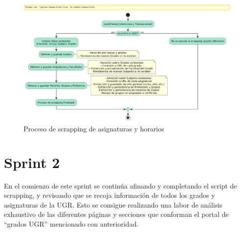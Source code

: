 \begin{figure}[H]
    \centering
    \includegraphics[width=1\textwidth, trim=0 0 0 45, clip]{figures/07_scrapping.png}
    \caption{Proceso de scrapping de asignaturas y horarios}
    \label{fig:scrapping-process}
\end{figure}

\section{Sprint 2}

En el comienzo de este sprint se continúa afinando y completando el script de scrapping, y revisando que se recoja información de todos los grados y asignaturas de la UGR. Esto se consigue realizando una labor de análisis exhaustivo de las diferentes páginas y secciones que conforman el portal de ``grados UGR'' mencionado con anterioridad.
